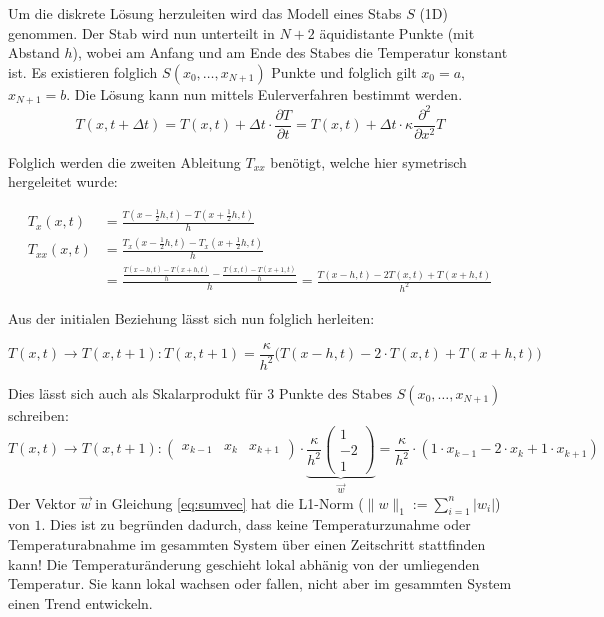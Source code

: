 Um die diskrete Lösung herzuleiten wird das Modell eines Stabs $S$ (1D) genommen. Der Stab wird nun unterteilt in $N+2$ äquidistante Punkte (mit Abstand $h$), wobei am Anfang und am Ende des Stabes die Temperatur konstant ist. Es existieren folglich $S(x_0, \dots, x_{N+1})$ Punkte und folglich gilt $x_0 = a$, $x_{N+1} = b$. Die Lösung kann nun mittels Eulerverfahren bestimmt werden.
\begin{equation}
T(x,t+\Delta t) = T(x,t) + \Delta t \cdot  \frac{\partial T}{\partial t} = T(x,t) + \Delta t \cdot \kappa \frac{\partial^2}{\partial x^2} T
\end{equation}

Folglich werden die zweiten Ableitung $T_{xx}$ benötigt, welche hier symetrisch hergeleitet wurde:

\begin{align}
T_{x}(x, t)  &= \frac{T(x-\frac{1}{2}h, t) - T(x+\frac{1}{2}h, t)}{h}\\
T_{xx}(x, t) &= \frac{T_{x}(x-\frac{1}{2}h, t) - T_{x}(x+\frac{1}{2}h, t)}{h} \\
&= \frac{\frac{T(x-h, t) - T(x+h, t)}{h} - \frac{T(x, t) - T(x+1,t)}{h}}{h} = \frac{T(x-h, t) - 2 T(x, t) + T(x+h, t)}{h^{2}}
\end{align}

Aus der initialen Beziehung lässt sich nun folglich herleiten:

\begin{equation}
T(x,t) \rightarrow T(x,t+1) : T(x,t+1) = \frac{\kappa}{h^{2}} \Big( T(x-h,t) - 2 \cdot T(x,t) + T(x+h,t)  \Big)
\end{equation}

Dies lässt sich auch als Skalarprodukt für 3 Punkte des Stabes $S(x_0, \dots, x_{N+1})$ schreiben: 
\begin{equation}
T(x,t) \rightarrow T(x,t+1) : \begin{pmatrix} x_{k-1} & x_{k} & x_{k+1} \end{pmatrix} \cdot \underbrace{\frac{\kappa}{h^2} \begin{pmatrix} 1 \\ -2 \\ 1 \end{pmatrix}}_{\vec{w}} =  \frac{\kappa}{h^2} \cdot \left( 1 \cdot x_{k-1} - 2 \cdot x_{k} + 1 \cdot x_{k+1} \right)
\label{eq:sumvec}
\end{equation}
Der Vektor $\vec{w}$ in Gleichung \ref{eq:sumvec} hat die L1-Norm ($\|w\|_{1}:=\sum _{{i=1}}^{n}|w_{i}|$) von $1$. Dies ist zu begründen dadurch, dass keine Temperaturzunahme oder Temperaturabnahme im gesammten System über einen Zeitschritt stattfinden kann! Die Temperaturänderung geschieht lokal abhänig von der umliegenden Temperatur. Sie kann lokal wachsen oder fallen, nicht aber im gesammten System einen Trend entwickeln.

